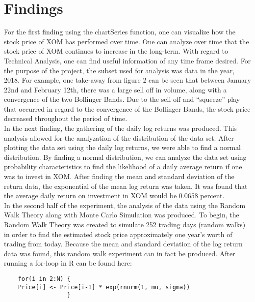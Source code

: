 \documentclass{article}
\begin{document}
\section{Findings}
For the first finding using the chartSeries function, one can visualize how the stock price of XOM has performed over time. One can analyze over time that the stock price of XOM continues to increase in the long-term. With regard to Technical Analysis, one can find useful information of any time frame desired. For the purpose of the project, the subset used for analysis was data in the year, 2018. For example, one take-away from figure 2 can be seen that between January 22nd and February 12th, there was a large sell off in volume, along with a convergence of the two Bollinger Bands. Due to the sell off and “squeeze” play that occurred in regard to the convergence of the Bollinger Bands, the stock price decreased throughout the period of time.
\\
In the next finding, the gathering of the daily log returns was produced. This analysis allowed for the analyzation of the distribution of the data set. After plotting the data set using the daily log returns, we were able to find a normal distribution. By finding a normal distribution, we can analyze the data set using probability characteristics to find the likelihood of a daily average return if one was to invest in XOM. After finding the mean and standard deviation of the return data, the exponential of the mean log return was taken. It was found that the average daily return on investment in XOM would be 0.0658 percent.
\\
In the second half of the experiment, the analysis of the data using the Random Walk Theory along with Monte Carlo Simulation was produced. To begin, the Random Walk Theory was created to simulate 252 trading days (random walks) in order to find the estimated stock price approximately one year’s worth of trading from today. Because the mean and standard deviation of the log return data was found, this random walk experiment can in fact be produced. After running a for-loop in R can be found here:
\begin{verbatim}
    for(i in 2:N) {
    Price[i] <- Price[i-1] * exp(rnorm(1, mu, sigma))
                  }
\end{verbatim}
\end{document}
